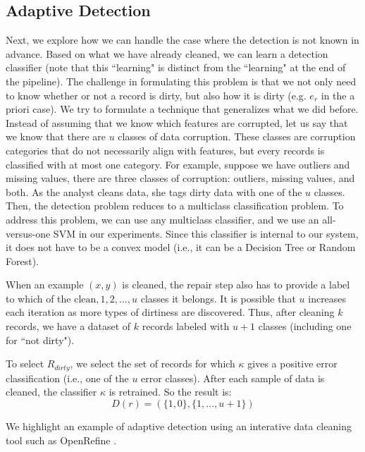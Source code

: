 \subsection{Adaptive Detection}
Next, we explore how we can handle the case where the detection is not known in advance.
Based on what we have already cleaned, we can learn a detection classifier (note that this ``learning" is distinct from the ``learning" at the end of the pipeline).
The challenge in formulating this problem is that we not only need to know whether or not a record is dirty, but also how it is dirty (e.g. $e_r$ in the a priori case).
We try to formulate a technique that generalizes what we did before.
Instead of assuming that we know which features are corrupted, let us say that we know that there are $u$ classes of data corruption.
These classes are corruption categories that do not necessarily align with features, but every records is classified with at most one category.
For example, suppose we have outliers and missing values, there are three classes of corruption: outliers, missing values, and both.
As the analyst cleans data, she tags dirty data with one of the $u$ classes.
Then, the detection problem reduces to a multiclass classification problem.
To address this problem, we can use any multiclass classifier, and we use an all-versus-one SVM in our experiments.
Since this classifier is internal to our system, it does not have to be a convex model (i.e., it can be a Decision Tree or Random Forest).

When an example $(x,y)$ is cleaned, the repair step also has to provide a label to which of the ${\text{clean}, 1,2,...,u}$ classes it belongs. It is possible that $u$ increases each iteration as more types of dirtiness are discovered. 
Thus, after cleaning $k$ records, we have a dataset of $k$ records labeled with $u+1$ classes (including one for ``not dirty").

\begin{definition}
To select $R_{dirty}$, we select the set of records for which $\kappa$ gives a positive error classification (i.e., one of the $u$ error classes).
After each sample of data is cleaned, the classifier $\kappa$ is retrained.
So the result is:
\[D(r) = (\{1,0\},\{1,...,u+1\})\]
\end{definition}

We highlight an example of adaptive detection using an interative data cleaning tool such as OpenRefine \cite{openrefine}.

\vspace{0.25em}

